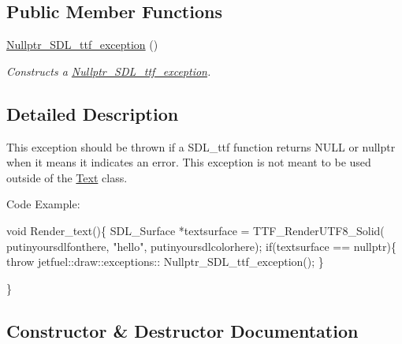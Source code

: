 \subsection*{Public Member Functions}
\begin{DoxyCompactItemize}
\item 
\hyperlink{classjetfuel_1_1draw_1_1exceptions_1_1Nullptr__SDL__ttf__exception_ac6644eee07afa5a2f8a972f98905f250}{Nullptr\+\_\+\+S\+D\+L\+\_\+ttf\+\_\+exception} ()
\begin{DoxyCompactList}\small\item\em Constructs a \hyperlink{classjetfuel_1_1draw_1_1exceptions_1_1Nullptr__SDL__ttf__exception}{Nullptr\+\_\+\+S\+D\+L\+\_\+ttf\+\_\+exception}. \end{DoxyCompactList}\end{DoxyCompactItemize}


\subsection{Detailed Description}
This exception should be thrown if a S\+D\+L\+\_\+ttf function returns N\+U\+LL or nullptr when it means it indicates an error. This exception is not meant to be used outside of the \hyperlink{classjetfuel_1_1draw_1_1Text}{Text} class.

Code Example\+:


\begin{DoxyCode}
\textcolor{keywordtype}{void} Render\_text()\{
    SDL\_Surface *textsurface = TTF\_RenderUTF8\_Solid(
                                putinyoursdlfonthere,
                                \textcolor{stringliteral}{"hello"},
                               putinyoursdlcolorhere);
    \textcolor{keywordflow}{if}(textsurface == \textcolor{keyword}{nullptr})\{
        \textcolor{keywordflow}{throw} jetfuel::draw::exceptions::
              Nullptr\_SDL\_ttf\_exception();
    \}

\}
\end{DoxyCode}
 

\subsection{Constructor \& Destructor Documentation}
\mbox{\label{classjetfuel_1_1draw_1_1exceptions_1_1Nullptr__SDL__ttf__exception_ac6644eee07afa5a2f8a972f98905f250}} 
